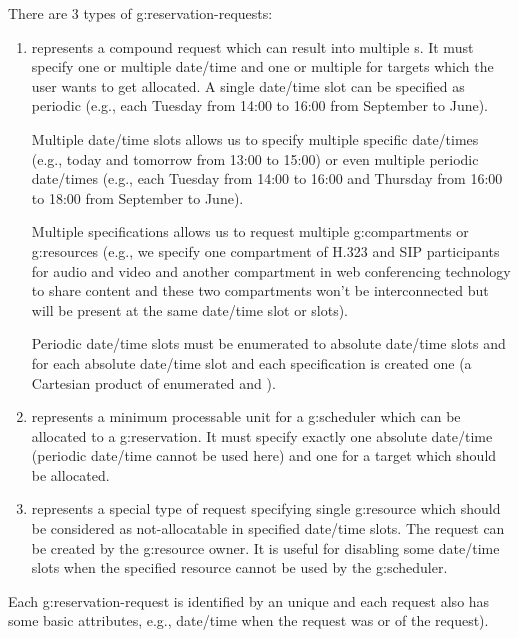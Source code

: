 There are 3 types of \glspl{g:reservation-request}:
\begin{enumerate}
\item {} represents a compound request which can result into multiple s. It must specify one or multiple date/time  and one or multiple  for targets which the user wants to get allocated. A single date/time slot can be specified as periodic (e.g., each Tuesday from 14:00 to 16:00 from September to June). 

Multiple date/time slots allows us to specify multiple specific date/times (e.g., today and tomorrow from 13:00 to 15:00) or even multiple periodic date/times (e.g., each Tuesday from 14:00 to 16:00 and Thursday from 16:00 to 18:00 from September to June).

Multiple specifications allows us to request multiple \glspl{g:compartment} or \glspl{g:resource} (e.g., we specify one compartment of H.323 and SIP participants for audio and video and another compartment in web conferencing technology to share content and these two compartments won't be interconnected but will be present at the same date/time slot or slots).

Periodic date/time slots must be enumerated to absolute date/time slots and for each absolute date/time slot and each specification is created one  (a Cartesian product of enumerated  and ).


\item {} represents a minimum processable unit for a \gls{g:scheduler} which can be allocated to a \gls{g:reservation}. It must specify exactly one absolute date/time  (periodic date/time cannot be used here) and one  for a target which should be allocated.

\item {} represents a special type of request specifying single \gls{g:resource} which should be considered as not-allocatable in specified date/time slots. The request can be created by the \gls{g:resource} owner. It is useful for disabling some date/time slots when the specified resource cannot be used by the \gls{g:scheduler}.
\end{enumerate}
Each \gls{g:reservation-request} is identified by an unique  and each request also has some basic attributes, e.g., date/time when the request was  or  of the request).

